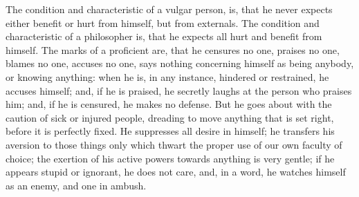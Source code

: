 The condition and characteristic of a vulgar person, is, that
he never expects either benefit or hurt from himself, but from externals.
The condition and characteristic of a philosopher is, that he expects
all hurt and benefit from himself. The marks of a proficient are,
that he censures no one, praises no one, blames no one, accuses no
one, says nothing concerning himself as being anybody, or knowing
anything: when he is, in any instance, hindered or restrained, he
accuses himself; and, if he is praised, he secretly laughs at the
person who praises him; and, if he is censured, he makes no defense.
But he goes about with the caution of sick or injured people, dreading
to move anything that is set right, before it is perfectly fixed.
He suppresses all desire in himself; he transfers his aversion to
those things only which thwart the proper use of our own faculty of
choice; the exertion of his active powers towards anything is very
gentle; if he appears stupid or ignorant, he does not care, and, in
a word, he watches himself as an enemy, and one in ambush.
